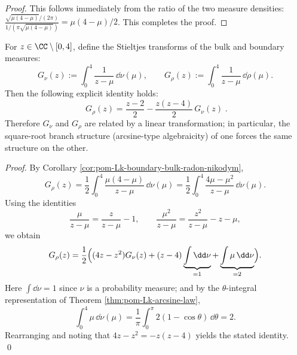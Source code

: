 \begin{proof}
This follows immediately from the ratio of the two measure densities:
\(
\frac{\sqrt{\mu(4-\mu)}/(2\pi)}{1/(\pi\sqrt{\mu(4-\mu)})}=\mu(4-\mu)/2
\).
This completes the proof.
\end{proof}

\begin{corollary}\label{cor:pom-Lk-stieltjes-linear-rigidity}
For \(z\in\CC\setminus[0,4]\), define the Stieltjes transforms of the bulk and boundary measures:
\[
G_\nu(z):=\int_{0}^{4}\frac{1}{z-\mu}\,\dd\nu(\mu),
\qquad
G_\rho(z):=\int_{0}^{4}\frac{1}{z-\mu}\,\dd\rho(\mu).
\]
Then the following explicit identity holds:
\[
\boxed{\;
G_\rho(z)=\frac{z-2}{2}-\frac{z(z-4)}{2}\,G_\nu(z)\; }.
\]
Therefore \(G_\nu\) and \(G_\rho\) are related by a linear transformation; in particular, the square-root branch structure (arcsine-type algebraicity) of one forces the same structure on the other.
\end{corollary}
\begin{proof}
By Corollary \ref{cor:pom-Lk-boundary-bulk-radon-nikodym},
\[
G_\rho(z)=\frac12\int_{0}^{4}\frac{\mu(4-\mu)}{z-\mu}\,\dd\nu(\mu)
=\frac12\int_{0}^{4}\frac{4\mu-\mu^2}{z-\mu}\,\dd\nu(\mu).
\]
Using the identities
\[
\frac{\mu}{z-\mu}=\frac{z}{z-\mu}-1,
\qquad
\frac{\mu^2}{z-\mu}=\frac{z^2}{z-\mu}-z-\mu,
\]
we obtain
\[
G_\rho(z)
=\frac12\Bigl((4z-z^2)G_\nu(z)+(z-4)\underbrace{\int\dd\nu}_{=1}+\underbrace{\int\mu\,\dd\nu}_{=2}\Bigr).
\]
Here \(\int\dd\nu=1\) since \(\nu\) is a probability measure;
and by the \(\theta\)-integral representation of Theorem \ref{thm:pom-Lk-arcsine-law},
\[
\int_{0}^{4}\mu\,\dd\nu(\mu)
=\frac{1}{\pi}\int_{0}^{\pi}2(1-\cos\theta)\,\dd\theta
=2.
\]
Rearranging and noting that \(4z-z^2=-z(z-4)\) yields the stated identity. \qed
\end{proof}


